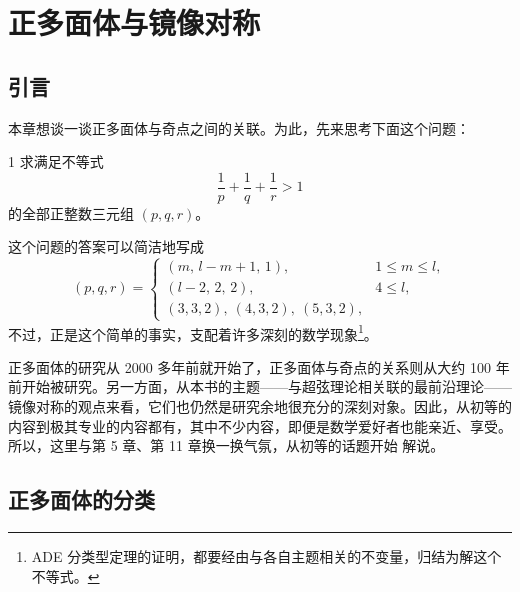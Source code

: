 \renewcommand{\thesection}{\arabic{section}}
\chapter{正多面体与镜像对称}

\section{引言}

本章想谈一谈正多面体与奇点之间的关联。为此，先来思考下面这个问题：

\begin{problem}{1}
  求满足不等式
  \begin{equation}
    \frac{1}{p}+\frac{1}{q}+\frac{1}{r}>1 \tag{1}
  \end{equation}
  的全部正整数三元组 $(p,q,r)$。
\end{problem}

这个问题的答案可以简洁地写成
\begin{equation}
  (p,q,r)=
  \begin{cases}
    (m,\,l-m+1,\,1), & 1\le m\le l,\\
    (l-2,\,2,\,2), & 4\le l,\\
    (3,3,2),\ (4,3,2),\ (5,3,2),
  \end{cases}
  \tag{2}
\end{equation}
不过，正是这个简单的事实，支配着许多深刻的数学现象\footnote{ADE 分类型定理的证明，都要经由与各自主题相关的不变量，归结为解这个不等式。}。

正多面体的研究从 2000 多年前就开始了，正多面体与奇点的关系则从大约 100 年前开始被研究。另一方面，从本书的主题——与超弦理论相关联的最前沿理论——镜像对称的观点来看，它们也仍然是研究余地很充分的深刻对象。因此，从初等的内容到极其专业的内容都有，其中不少内容，即便是数学爱好者也能亲近、享受。所以，这里与第 5 章、第 11 章换一换气氛，从初等的话题开始
解说。

\section{正多面体的分类}

